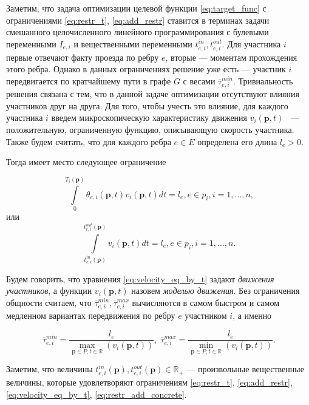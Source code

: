 \documentclass[12pt, a4paper]{article}
\begin{document}
Заметим, что задача оптимизации целевой функции \eqref{eq:target_func} с ограничениями \eqref{eq:restr_t}, \eqref{eq:add_restr} ставится в терминах задачи смешанного целочисленного линейного программирования с булевыми переменными $I_{e, i}$ и вещественными переменными $t_{e, i}^{in}, t_{e, i}^{out}$. Для участника $i$ первые отвечают факту проезда по ребру $e$, вторые --- моментам прохождения этого ребра. Однако в данных ограничениях решение уже есть --- участник $i$ передвигается по кратчайшему пути в графе $G$ с весами $\overline{\tau}_{e, i}^{min}$. Тривиальность решения связана с тем, что в данной задаче оптимизации отсутствуют влияния участников друг на друга. Для того, чтобы учесть это влияние, для каждого участника $i$ введем микроскопическую характеристику движения $v_i(\textbf{p}, t)$ ~--- положительную, ограниченную функцию, описывающую скорость участника. Также будем считать, что для каждого ребра $e \in E$ определена его длина $l_e > 0$.

Тогда имеет место следующее ограничение

\begin{equation}
	\label{eq:velocity_eq_by_theta}
	\int\limits_{0}^{T_i(\textbf{p})} \theta_{e, i} (\textbf{p}, t) v_i(\textbf{p}, t) dt = l_e, e \in p_i, i = 1, \dots, n,
\end{equation}
или
\begin{equation}
	\label{eq:velocity_eq_by_t}
	\int\limits_{t_{e, i}^{in}(\textbf{p})}^{t_{e, i}^{out}(\textbf{p})} v_i(\textbf{p}, t) dt = l_e, e \in p_i, i = 1, \dots, n.
\end{equation}

Будем говорить, что уравнения \eqref{eq:velocity_eq_by_t} задают \textit{движения участников}, а функции $v_i(\textbf{p}, t)$ назовем \textit{моделью движения}. Без ограничения общности считаем, что $\overline{\tau}_{e, i}^{min}, \overline{\tau}_{e, i}^{max}$ вычисляются в самом быстром и самом медленном вариантах передвижения по ребру $e$ участником $i$, а именно

\begin{equation}
	\label{eq:restr_add_concrete}
	\overline{\tau}_{e, i}^{min} = \frac{l_e}{\max\limits_{\textbf{p} \in P, t \in \mathbb{R}} \left(  v_i(\textbf{p}, t) \right)}, \; \overline{\tau}_{e, i}^{max} = \frac{l_e}{\min\limits_{\textbf{p} \in P, t \in \mathbb{R}} \left(  v_i(\textbf{p}, t) \right)}.
\end{equation}

Заметим, что величины $t_{e, i}^{in}(\textbf{p}), t_{e, i}^{out}(\textbf{p}) \in \mathbb{R}_+$ --- произвольные вещественные величины, которые удовлетворяют ограничениям \eqref{eq:restr_t}, \eqref{eq:add_restr}, \eqref{eq:velocity_eq_by_t}, \eqref{eq:restr_add_concrete}.
\end{document}
